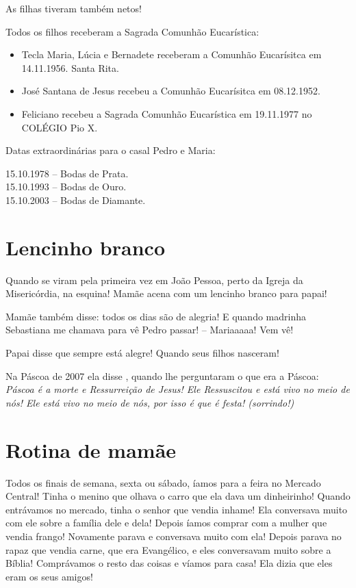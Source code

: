 \documentclass[
  brazil,
  a6paper,
  oneside,
  landscape,
  14pt]{scrbook}
\begin{document}
As filhas tiveram também netos!

Todos os filhos receberam a Sagrada Comunhão Eucarística:

\begin{itemize}
\item
  Tecla Maria, Lúcia e Bernadete receberam a Comunhão Eucarísitca em
  14.11.1956. Santa Rita.
\item
  José Santana de Jesus recebeu a Comunhão Eucarísitca em 08.12.1952.
\item
  Feliciano recebeu a Sagrada Comunhão Eucarística em 19.11.1977 no
  COLÉGIO Pio X.
\end{itemize}

Datas extraordinárias para o casal Pedro e Maria:

15.10.1978 -- Bodas de Prata.\\
15.10.1993 -- Bodas de Ouro.\\
15.10.2003 -- Bodas de Diamante.

\hypertarget{lencinho-branco}{%
\section{Lencinho branco}\label{lencinho-branco}}

Quando se viram pela primeira vez em João Pessoa, perto da Igreja da
Misericórdia, na esquina! Mamãe acena com um lencinho branco para papai!

Mamãe também disse: todos os dias são de alegria! E quando madrinha
Sebastiana me chamava para vê Pedro passar! -- Mariaaaaa! Vem vê!

Papai disse que sempre está alegre! Quando seus filhos nasceram!

Na Páscoa de 2007 ela disse , quando lhe perguntaram o que era a Páscoa:
\emph{Páscoa é a morte e Ressurreição de Jesus! Ele Ressuscitou e está
vivo no meio de nós! Ele está vivo no meio de nós, por isso é que é
festa! (sorrindo!)}

\hypertarget{rotina-de-mamuxe3e}{%
\section{Rotina de mamãe}\label{rotina-de-mamuxe3e}}

Todos os finais de semana, sexta ou sábado, íamos para a feira no
Mercado Central! Tinha o menino que olhava o carro que ela dava um
dinheirinho! Quando entrávamos no mercado, tinha o senhor que vendia
inhame! Ela conversava muito com ele sobre a família dele e dela! Depois
íamos comprar com a mulher que vendia frango! Novamente parava e
conversava muito com ela! Depois parava no rapaz que vendia carne, que
era Evangélico, e eles conversavam muito sobre a Bíblia! Comprávamos o
resto das coisas e víamos para casa! Ela dizia que eles eram os seus
amigos!
\end{document}

